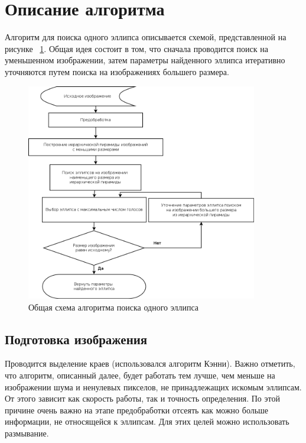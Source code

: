 \section{Описание алгоритма}
Алгоритм для поиска одного эллипса описывается схемой, представленной на рисунке ~\ref{fig:oneellipse}. 
Общая идея состоит в том, что сначала проводится поиск на уменьшенном изображении, затем параметры найденного эллипса итеративно уточняются путем поиска на изображениях большего размера.
\begin{figure}[H]
\centering
\caption{\label{fig:oneellipse} Общая схема алгоритма поиска одного эллипса}
\includegraphics[width=0.9\textwidth]{img/oneellipse.png}
\end{figure}
\subsection{Подготовка изображения}
Проводится выделение краев (использовался алгоритм Кэнни). Важно отметить, что алгоритм, описанный далее, будет работать тем лучше, чем меньше на изображении шума и ненулевых пикселов,
не принадлежащих искомым эллипсам. От этого зависит как скорость работы, так и точность определения. 
По этой причине очень важно на этапе предобработки отсеять как можно больше информации, не относящейся к эллипсам. Для этих целей можно использовать размывание.
